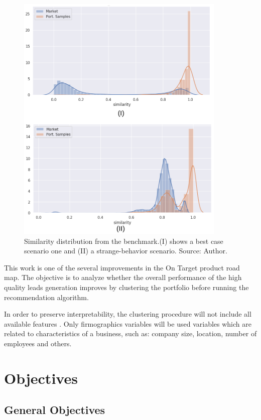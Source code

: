 \begin{figure}
   \centering
   \includegraphics[width=10cm]{fig/int-simi-dist-expected-real.png} 
   \caption{Similarity distribution from the benchmark.(I) shows a best case scenario one and (II) a strange-behavior scenario. Source: Author.}
   \label{fig:simi-dist-expected-real}
\end{figure}

This work is one of the several improvements in the On Target product road map. The objective is to analyze whether the overall performance of the high quality leads generation improves by clustering the portfolio before running the recommendation algorithm. 

In order to preserve interpretability, the clustering procedure will not include all available features . Only firmographics variables will be used\cite{wikipedia_firmographics} variables which are related to characteristics of a business, such as: company size, location, number of employees and others. 

\section{Objectives}

\subsection{General Objectives}

